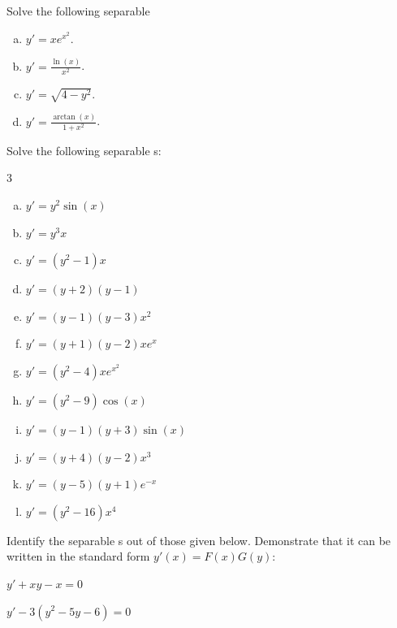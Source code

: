\begin{question}
  Solve the following separable \ode{}
  \begin{enumerate}[(a)]
  \item $\displaystyle y' = x e^{x^2}$.
  \item $\displaystyle y' = \frac{\ln(x)}{x^2}$.
  \item $\displaystyle y' = \sqrt{4-y^2}$.
  \item $\displaystyle y' = \frac{\arctan(x)}{1+x^2}$.
\end{enumerate}
\end{question}

\begin{question}
  Solve the following separable \ode{}s:
  \begin{multicols}{3}
  \begin{enumerate}[(a)]
    \item $\displaystyle y' = y^2 \sin(x)$
    \item $\displaystyle y' = y^3 x$
    \item $\displaystyle y' = (y^2-1)x$
    \item $\displaystyle y' = (y+2)(y-1)$
    \item $\displaystyle y' = (y-1)(y-3)x^2$
    \item $\displaystyle y' = (y+1)(y-2)x e^x$
    \item $\displaystyle y' = (y^2-4)xe^{x^2}$
    \item $\displaystyle y' = (y^2-9)\cos(x)$
    \item $\displaystyle y' = (y-1)(y+3)\sin(x)$
    \item $\displaystyle y' = (y+4)(y-2)x^3$
    \item $\displaystyle y' = (y-5)(y+1)e^{-x}$
    \item $\displaystyle y' = (y^2-16)x^4$
  \end{enumerate}
  \end{multicols}
\end{question}

\begin{question}Identify the separable \ode{}s out of those given below. Demonstrate that it can be written in the standard form \(y'(x) = F(x) G(y)\):
  \begin{colenumerate}
  \item $y'+xy-x=0$
  \item $y'-3(y^2-5y-6) = 0$
  \end{colenumerate}
\end{question}


